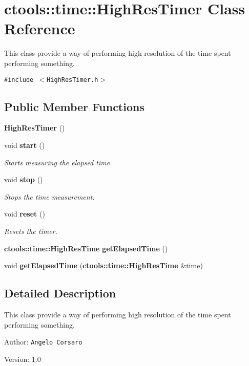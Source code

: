 \section{ctools::time::High\-Res\-Timer Class Reference}
\label{classctools_1_1time_1_1HighResTimer}
This class provide a way of performing high resolution of the time spent performing something.  


{\tt \#include $<$High\-Res\-Timer.h$>$}

\subsection*{Public Member Functions}
\begin{CompactItemize}
\item 
{\bf High\-Res\-Timer} ()
\item 
void {\bf start} ()
\begin{CompactList}\small\item\em Starts measuring the elapsed time. \item\end{CompactList}\item 
void {\bf stop} ()
\begin{CompactList}\small\item\em Stops the time measurement. \item\end{CompactList}\item 
void {\bf reset} ()
\begin{CompactList}\small\item\em Resets the timer. \item\end{CompactList}\item 
{\bf ctools::time::High\-Res\-Time} {\bf get\-Elapsed\-Time} ()
\item 
void {\bf get\-Elapsed\-Time} ({\bf ctools::time::High\-Res\-Time} \&time)
\end{CompactItemize}


\subsection{Detailed Description}
This class provide a way of performing high resolution of the time spent performing something. 

\begin{Desc}
\item[Author:]{\tt Angelo Corsaro} \end{Desc}
\begin{Desc}
\item[Version:]1.0 \end{Desc}




